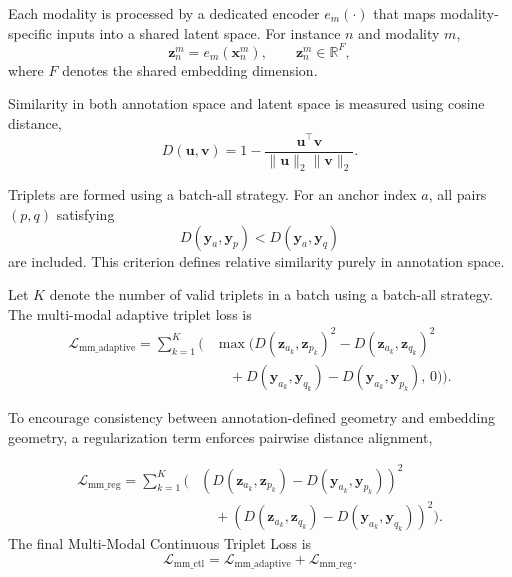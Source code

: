 \documentclass[lettersize,journal]{IEEEtran}
\begin{document}
Each modality is processed by a dedicated encoder
$e_m(\cdot)$ that maps modality-specific inputs into a shared latent space.
For instance $n$ and modality $m$,
\begin{equation}
\mathbf{z}_n^{m}
=
e_m\!\left(\mathbf{x}_n^{m}\right),
\qquad
\mathbf{z}_n^{m} \in \mathbb{R}^{F},
\end{equation}
where $F$ denotes the shared embedding dimension.

Similarity in both annotation space and latent space is measured using cosine
distance,
\begin{equation}
D(\mathbf{u},\mathbf{v})
=
1 -
\frac{
\mathbf{u}^{\top}\mathbf{v}
}{
\|\mathbf{u}\|_2 \|\mathbf{v}\|_2
}.
\end{equation}

Triplets are formed using a batch-all strategy. For an anchor index $a$, all
pairs $(p,q)$ satisfying
\begin{equation}
D(\mathbf{y}_a,\mathbf{y}_p)
<
D(\mathbf{y}_a,\mathbf{y}_q)
\end{equation}
are included. This criterion defines relative similarity purely in annotation
space.

Let $K$ denote the number of valid triplets in a batch using a batch-all strategy. The multi-modal
adaptive triplet loss is
\begin{equation}
\begin{aligned}
\mathcal{L}_{\text{mm\_adaptive}}
=
\sum_{k=1}^{K}
\Big(
& \max\!\big(
D(\mathbf{z}_{a_k},\mathbf{z}_{p_k})^2
-
D(\mathbf{z}_{a_k},\mathbf{z}_{q_k})^2 \\
& \quad +
D(\mathbf{y}_{a_k},\mathbf{y}_{q_k})
-
D(\mathbf{y}_{a_k},\mathbf{y}_{p_k}),
\, 0
\big)
\Big).
\end{aligned}
\end{equation}

To encourage consistency between annotation-defined geometry and embedding
geometry, a regularization term enforces pairwise distance alignment,

\begin{equation}
\begin{aligned}
\mathcal{L}_{\text{mm\_reg}}
=
\sum_{k=1}^{K}
\Big(
& \left(
D(\mathbf{z}_{a_k},\mathbf{z}_{p_k})
-
D(\mathbf{y}_{a_k},\mathbf{y}_{p_k})
\right)^2 \\
& \quad +
\left(
D(\mathbf{z}_{a_k},\mathbf{z}_{q_k})
-
D(\mathbf{y}_{a_k},\mathbf{y}_{q_k})
\right)^2
\Big).
\end{aligned}
\end{equation}
The final Multi-Modal Continuous Triplet Loss is
\begin{equation}
\mathcal{L}_{\text{mm\_ctl}}
=
\mathcal{L}_{\text{mm\_adaptive}}
+
\mathcal{L}_{\text{mm\_reg}}.
\end{equation}
\end{document}
